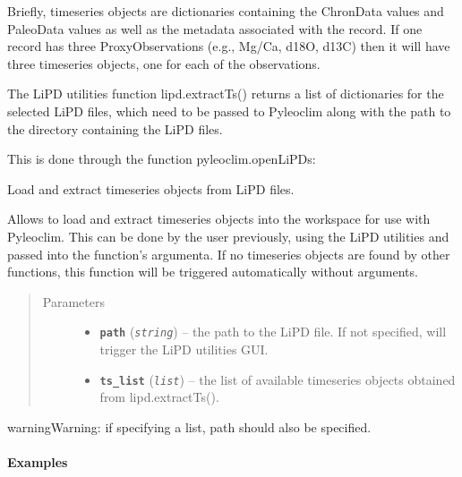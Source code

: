 \documentclass[letterpaper,10pt,english]{sphinxmanual}
\begin{document}
Briefly, timeseries objects are dictionaries containing the ChronData values and
PaleoData values as well as the metadata associated with the record. If one record
has three ProxyObservations (e.g., Mg/Ca, d18O, d13C) then it will have three timeseries
objects, one for each of the observations.

The LiPD utilities function lipd.extractTs() returns a list of dictionaries for
the selected LiPD files, which need to be passed to Pyleoclim along with the path
to the directory containing the LiPD files.

This is done through the function pyleoclim.openLiPDs:

\begin{fulllineitems}
\label{Main:pyleoclim.openLipds}
Load and extract timeseries objects from LiPD files.

Allows to load and extract timeseries objects into the workspace for use
with Pyleoclim. This can be done by the user previously, using the LiPD
utilities and passed into the function's argumenta. If no timeseries objects
are found by other functions, this function will be triggered automatically
without arguments.
\begin{quote}\begin{description}
\item[{Parameters}] \leavevmode\begin{itemize}
\item {} 
\textbf{\texttt{path}} (\emph{\texttt{string}}) -- the path to the LiPD file. If not specified, will
trigger the LiPD utilities GUI.

\item {} 
\textbf{\texttt{ts\_list}} (\emph{\texttt{list}}) -- the list of available timeseries objects
obtained from lipd.extractTs().

\end{itemize}

\end{description}\end{quote}

\begin{notice}{warning}{Warning:}
if specifying a list, path should also be specified.
\end{notice}
\paragraph{Examples}


\end{fulllineitems}
\end{document}
